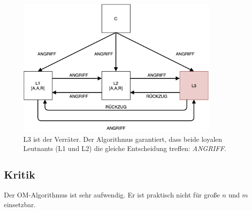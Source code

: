 \documentclass{article}
\begin{document}
\begin{figure}[H]
    \centering
    \includegraphics[width=0.9\textwidth]{omalgo.png}
    \caption{L3 ist der Verräter. Der Algorithmus garantiert, dass beide loyalen Leutnants (L1 und L2) die gleiche Entscheidung treffen: \textit{ANGRIFF}. }
    \label{fig:OMAlgorithm}
\end{figure}

\subsection{Kritik}

Der OM-Algorithmus ist sehr aufwendig. Er ist praktisch nicht für große $n$ und $m$ einsetzbar.  
\end{document}
